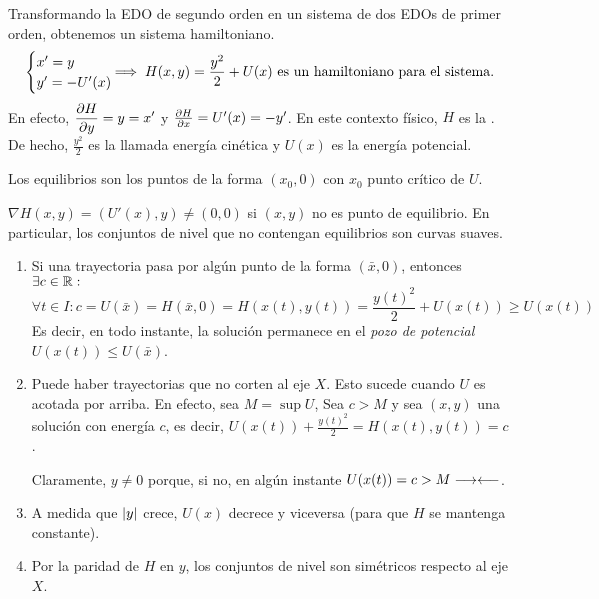 \begin{obs}
	Transformando la EDO de segundo orden en un sistema de dos EDOs de primer orden, obtenemos un sistema hamiltoniano.
	\[\begin{cases}
			x' = y \\
			y' = -U'(x)
		\end{cases} \hspace{-0.5cm} \implies H(x, y) = \frac{y^2}{2} + U(x)\tex{ es un hamiltoniano para el sistema.}\]
	En efecto, $\displaystyle \pdv{H}{y} = y = x'$ y $\pdv{H}{x} = U'(x) = -y'$. En este contexto físico, $H$ es la . \\
	De hecho, $\frac{y^2}{2}$ es la llamada energía cinética y $U(x)$ es la energía potencial.

	Los equilibrios son los puntos de la forma $(x_0, 0)$ con $x_0$ punto crítico de $U$.
\end{obs}

\begin{obs}
	$\nabla H (x, y) = (U'(x), y) \neq (0, 0)$ si $(x, y)$ no es punto de equilibrio. En particular, los conjuntos de nivel que no contengan equilibrios son curvas suaves.
\end{obs}


\begin{enumerate}
	\item Si una trayectoria pasa por algún punto de la forma $(\bar{x}, 0)$, entonces $\exists c \in \mathbb{R} :$
	      \[\forall t \in I : c = U(\bar{x}) = H(\bar{x}, 0) = H(x(t), y(t)) = \frac{y(t)^2}{2} + U(x(t)) \geq U(x(t))\]
	      Es decir, en todo instante, la solución permanece en el \textit{pozo de potencial} $U(x(t)) \leq U(\bar{x})$.
	\item Puede haber trayectorias que no corten al eje $X$. Esto sucede cuando $U$ es acotada por arriba. En efecto, sea $M = \sup U$, Sea $c> M $ y sea $(x, y)$ una solución con energía $c$, es decir, $U(x(t)) + \frac{y(t)^2}{2} = H(x(t), y(t)) = c$.

	      Claramente, $y\neq 0$ porque, si no, en algún instante $U(x(t)) = c > M \longrightarrow\longleftarrow$.

	\item A medida que $\left|y\right|$ crece, $U(x)$ decrece y viceversa (para que $H$ se mantenga constante).

	\item Por la paridad de $H$ en $y$, los conjuntos de nivel son simétricos respecto al eje $X$.
\end{enumerate}